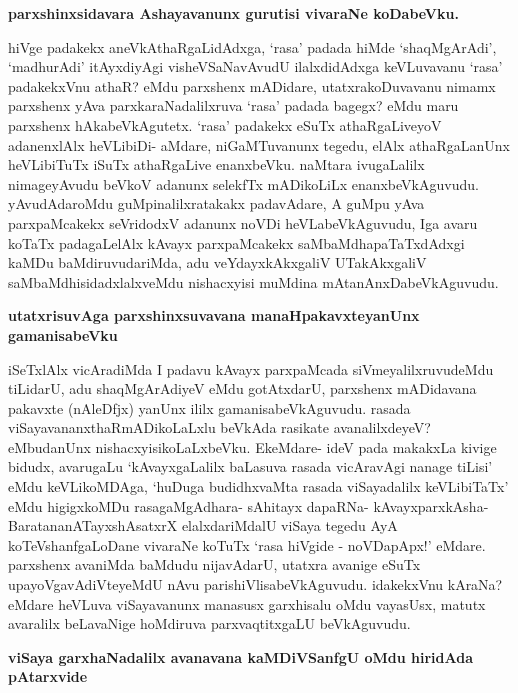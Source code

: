 {\bigskip
\noindent
{\large\bf parxshinxsidavara Ashayavanunx gurutisi vivaraNe koDabeVku.}}\label{page218}
\medskip

\noindent
hiVge padakekx aneVkAthaRgaLidAdxga, `rasa' padada hiMde `shaqMgArAdi', `madhurAdi' itAyxdiyAgi visheV\-SaNavAvudU ilalxdidAdxga keVLuvavanu `rasa' padakekxVnu athaR? eMdu parxshenx mADidare, utatxrakoDu\-vavanu nimamx parxshenx yAva parxkaraNadalilxruva `rasa' padada bagegx? eMdu maru parxshenx hAkabeVkAgutetx. `rasa' padakekx eSuTx athaR\-gaLiveyoV adanenxlAlx heVLibiDi- aMdare, niGaMTuvanunx tegedu, elAlx athaR\break\-gaLanUnx heVLibiTuTx iSuTx athaRgaLive enanxbeVku. naMtara ivugaLalilx nimage\break yAvudu beVkoV adanunx selekfTx mADi\-koLiLx enanxbeVkAguvudu. yAvudAda\-roMdu guMpinalilxratakakx padavAdare, A guMpu yAva parxpaMcakekx seVridodxV adanunx noVDi heVLabeVkAguvudu, Iga avaru koTaTx padagaLelAlx kAvayx parxpaMcakekx saMbaMdhapaTaTxdAdxgi kaMDu baMdiruvudariMda, adu veYdayxkAkxgaliV UTakAkxgaliV saMbaMdhisidadxlalx\-veMdu nishacxyisi muMdina mAtanAnxDabeVkAguvudu.

\newpage

{\noindent
{\large\bf utatxrisuvAga parxshinxsuvavana manaHpakavxteyanUnx gamanisabeVku}}\label{page219}
\medskip

\noindent
iSeTxlAlx vicAradiMda I padavu kAvayx parxpaMcada siVmeyalilxruvudeMdu tiLidarU, adu shaqM\-gArAdiyeV eMdu gotAtxdarU, parxshenx mADidavana pakavxte (nAleDfjx) yanUnx ililx gamanisabeVkAgu\-vudu. rasada viSayavananxthaRmADikoLaLxlu beVkAda rasikate avanalilxdeyeV? eMbudanUnx nishacxyisi\-koLaLxbeVku. EkeMdare- ideV pada makakxLa kivige bidudx, avarugaLu `kAvayxgaLalilx baLasuva rasada vicAra\-vAgi nanage tiLisi' eMdu keVLikoMDAga, `huDuga budidhxvaMta rasada viSayadalilx keVLibiTaTx' eMdu higigxkoMDu rasagaMgAdhara- sAhitayx dapaRNa- kAvayxparxkAsha- BaratananATayxshAsatxrX elalxdariMdalU viSaya tegedu AyA koTeVshanfgaLoDane vivaraNe koTuTx `rasa hiVgide - noVDapApx!' eMdare. parxshenx avaniMda baMdudu nijavAdarU, utatxra avanige eSuTx upayoVgavAdiVteyeMdU nAvu parishiVlisabeVkAgu\-vudu. idakekxVnu kAraNa? eMdare heVLuva viSayavanunx manasusx garxhisalu oMdu vayasUsx, matutx avaralilx beLavaNige hoMdiruva parxvaqtitxgaLU beVkAguvudu.

{\bigskip
\noindent
{\large\bf viSaya garxhaNadalilx avanavana kaMDiVSanfgU oMdu hiridAda pAtarxvide}}\label{page219}
\medskip

